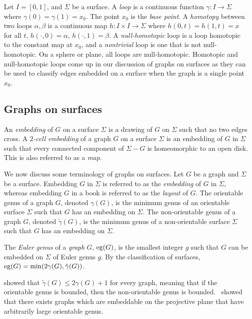 Let $I = [0, 1]$, and $\Sigma$ be a surface.
A \textit{loop} is a continuous function $\gamma : I \rightarrow \Sigma$ where $\gamma(0) = \gamma(1) = x_0$. The point $x_0$ is the \textit{base point}. A \textit{homotopy} between two loops $\alpha, \beta$ is a continuous map $h : I \times I \rightarrow \Sigma$ where $h(0, t) = h(1, t) = x$ for all $t$, $h(\cdot, 0) = \alpha$, $h(\cdot, 1) = \beta$. A \textit{null-homotopic} loop is a loop homotopic to the constant map at $x_0$, and a \textit{nontrivial} loop is one that is not null-homotopic. On a sphere or plane, all loops are null-homotopic. Homotopic and null-homotopic loops come up in our discussion of graphs on surfaces as they can be used to classify edges embedded on a surface when the graph is a single point $x_0$. 


\subsection{Graphs on surfaces}

An \textit{embedding} of $G$ on a surface $\Sigma$ is a drawing of $G$ on $\Sigma$ such that no two edges cross. 
A \textit{$2$-cell embedding} of a graph $G$ on a surface $\Sigma$ is an embedding of $G$ in $\Sigma$ such that every connected component of $\Sigma - G$ is homeomorphic to an open disk. This is also referred to as a \textit{map}.

We now discuss some terminology of graphs on surfaces. Let $G$ be a graph and $\Sigma$ be a surface. Embedding $G$ in $\Sigma$ is referred to as the \textit{embedding} of $G$ in $\Sigma$, whereas embedding $G$ in a book is referred to as the \textit{layout} of $G$. The orientable genus of a graph \(G\), denoted \(\gamma(G)\), is the minimum genus of an orientable surface $\Sigma$ such that $G$ has an embedding on $\Sigma$. The non-orientable genus of a graph \(G\), denoted \(\tilde{\gamma}(G)\), is the minimum genus of a non-orientable surface $\Sigma$ such that $G$ has an embedding on $\Sigma$. 

The \textit{Euler genus} of a \textit{graph} \(G\), $\operatorname{eg}(G)$, is the smallest integer \(g\) such that \(G\) can be embedded on $\Sigma$ of Euler genus $g$. By the classification of surfaces, $\operatorname{eg}(G) = \min(2 \gamma(G), \tilde{\gamma}(G))$. 

\textcite{moharOrientableGenusGraphs1998} showed that \(\tilde{\gamma}(G) \leq 2 \gamma(G) + 1\) for every graph, meaning that if the orientable genus is bounded, then the non-orientable genus is bounded.\ \textcite{auslanderImbeddingGraphsManifolds1963} showed that there exists graphs which are embeddable on the projective plane that have arbitrarily large orientable genus. 

